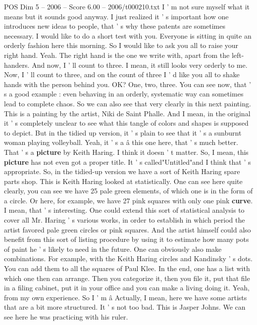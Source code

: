 \begin{textsample}{POS Dim 5 – 2006 – Score 6.00 – 2006/t000210.txt}
I ' m not sure myself what it means but it sounds good anyway.
I just realized it ' s important how one introduces new ideas to people, that ' s why these patents are sometimes necessary.
I would like to do a short test with you.
Everyone is sitting in quite an orderly fashion here this morning.
So I would like to ask you all to raise your right hand.
Yeah.
The right hand is the one we write with, apart from the left-handers.
And now, I ' ll count to three.
I mean, it still looks very orderly to me.
Now, I ' ll count to three, and on the count of three I ' d like you all to shake hands with the person behind you.
OK?
One, two, three.
You can see now, that ' s a good example : even behaving in an orderly, systematic way can sometimes lead to complete chaos.
So we can also see that very clearly in this next painting.
This is a painting by the artist, Niki de Saint Phalle.
And I mean, in the original it ' s completely unclear to see what this tangle of colors and shapes is supposed to depict.
But in the tidied up version, it ' s plain to see that it ' s a sunburnt woman playing volleyball.
Yeah, it ' s a â this one here, that ' s much better.
That ' s a \textbf{picture} by Keith Haring.
I think it doesn ' t matter.
So, I mean, this \textbf{picture} has not even got a proper title.
It ' s called"Untitled"and I think that ' s appropriate.
So, in the tidied-up version we have a sort of Keith Haring spare parts shop.
This is Keith Haring looked at statistically.
One can see here quite clearly, you can see we have 25 pale green elements, of which one is in the form of a circle.
Or here, for example, we have 27 pink squares with only one pink \textbf{curve}.
I mean, that ' s interesting.
One could extend this sort of statistical analysis to cover all Mr.
Haring ' s various works, in order to establish in which period the artist favored pale green circles or pink squares.
And the artist himself could also benefit from this sort of listing procedure by using it to estimate how many pots of paint he ' s likely to need in the future.
One can obviously also make combinations.
For example, with the Keith Haring circles and Kandinsky ' s dots.
You can add them to all the squares of Paul Klee.
In the end, one has a list with which one then can arrange.
Then you categorize it, then you file it, put that file in a filing cabinet, put it in your office and you can make a living doing it.
Yeah, from my own experience.
So I ' m â Actually, I mean, here we have some artists that are a bit more structured.
It ' s not too bad.
This is Jasper Johns.
We can see here he was practicing with his ruler.

\end{textsample}
